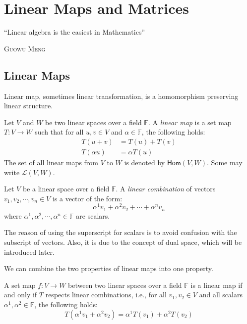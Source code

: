 \documentclass[
	11pt, %
	fleqn, %
	a4paper, %
]{LegrandOrangeBook}
\newcommand{\Hom}{\mathsf{Hom}} %
\newcommand{\F}{\mathbb{F}} %
\let\originalepigraph\epigraph
\renewcommand\epigraph[2]{\originalepigraph{#1}{\textsc{#2}}}
\begin{document}

\chapter{Linear Maps and Matrices}

\epigraph{``Linear algebra is the easiest in Mathematics''}{Guowu Meng}

\section{Linear Maps}

Linear map, sometimes linear transformation, is a homomorphism preserving linear structure.

\begin{definition}
    Let $V$ and $W$ be two linear spaces over a field $\F$. A \emph{linear map} is a set map $T: V \to W$ such that for all $u, v \in V$ and $\alpha \in \F$, the following holds:
    \[
        \begin{split}
            T(u + v) &= T(u) + T(v) \\
            T(\alpha u) &= \alpha T(u)
        \end{split}
    \]
    The set of all linear maps from $V$ to $W$ is denoted by $\Hom(V, W)$. Some may write {$\mathcal{L}(V, W)$}.
\end{definition}

\begin{definition}
    Let $V$ be a linear space over a field $\F$. A \emph{linear combination} of vectors $v_1, v_2, \cdots, v_n \in V$ is a vector of the form:
    \[
        \alpha^1 v_1 + \alpha^2 v_2 + \cdots + \alpha^n v_n
    \]
    where $\alpha^1, \alpha^2, \cdots, \alpha^n \in \F$ are scalars.
\end{definition}

The reason of using the superscript for scalars is to avoid confusion with the subscript of vectors. Also, it is due to the concept of dual space, which will be introduced later.

We can combine the two properties of linear maps into one property.

\begin{corollary}
    A set map $f: V \to W$ between two linear spaces over a field $\F$ is a linear map if and only if $T$ respects linear combinations, i.e., for all $v_1, v_2 \in V$ and all scalars $\alpha^1, \alpha^2 \in \F$, the following holds:
    \[
        T(\alpha^1 v_1 + \alpha^2 v_2) = \alpha^1 T(v_1) + \alpha^2 T(v_2)
    \]
\end{corollary}
\end{document}
